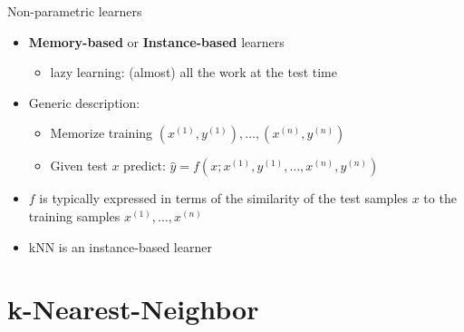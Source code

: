 \documentclass[serif, aspectratio=169]{beamer}
\begin{document}
\begin{frame}{Non-parametric learners}
    \begin{itemize}
        \item \textbf{Memory-based} or \textbf{Instance-based} learners
        \begin{itemize}
            \item lazy learning: (almost) all the work at the test time
        \end{itemize}
        
        \item Generic description:
        \begin{itemize}
            \item Memorize training $(x^{(1)}, y^{(1)}), \dots, (x^{(n)}, y^{(n)})$
            \item Given test $x$ predict: $\hat{y} = f(x;x^{(1)}, y^{(1)}, \dots, x^{(n)}, y^{(n)})$
        \end{itemize}
        \item $f$ is typically expressed in terms of the similarity of the test samples $x$ to the training samples $x^{(1)}, \dots, x^{(n)}$
        \item kNN is an instance-based learner
    \end{itemize}
\end{frame}

\section{k-Nearest-Neighbor}
    
\end{document}
